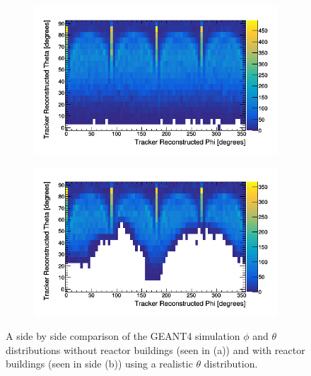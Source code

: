 \begin{figure}[!h]
\centering
\begin{subfigure}{.5\textwidth}
  \centering
  \includegraphics[width=\linewidth]{Chapter5/Figs/wylfaRasterNew/thetaVsPhiSimulatedWithReactor0.png}
  \captionsetup{width=.9\linewidth}
  \caption{}
  \label{subFig:thetaVsPhiSimulatedWithReactor0}
\end{subfigure}%
\begin{subfigure}{.5\textwidth}
  \centering
\includegraphics[width=\linewidth]{Chapter5/Figs/wylfaRasterNew/thetaVsPhiSimulatedWithReactor100.png}
  \captionsetup{width=.9\linewidth}
  \caption{}
  \label{subFig:thetaVsPhiSimulatedWithReactor100}
\end{subfigure}
\caption{A side by side comparison of the GEANT4 simulation $\phi$ and $\theta$ distributions without reactor buildings (seen in (a)) and with reactor buildings (seen in side (b)) using a realistic $\theta$ distribution.}
\label{fig:thetaVsPhiSimulatedWithReactor_0-100}
\end{figure}

